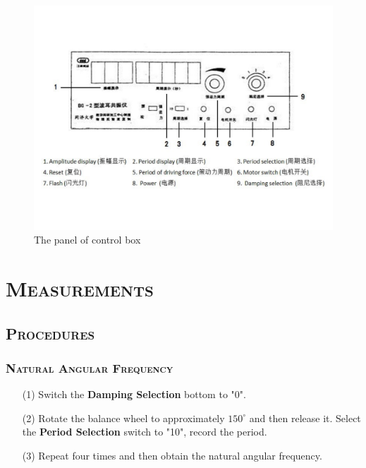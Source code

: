 \documentclass[a4paper,12pt]{article}
\begin{document}
\begin{figure}[h] 
    \centering
    \includegraphics[width=1\textwidth]{Fig3} 
    \caption{The panel of control box \cite{labmanual}} 
\end{figure}

\section{\textsc{Measurements}}
\subsection{\textsc{Procedures \cite{labmanual}}}
\subsubsection{\textsc{Natural Angular Frequency}}
\begin{itemize}
\item[(1)] Switch the \textbf{Damping Selection} bottom to "0".
\item[(2)] Rotate the balance wheel to approximately $150^{\circ}$ and then release it. Select the \textbf{Period Selection} switch to "10", record the period.
\item[(3)] Repeat four times and then obtain the natural angular frequency.
\end{itemize}
\end{document}
